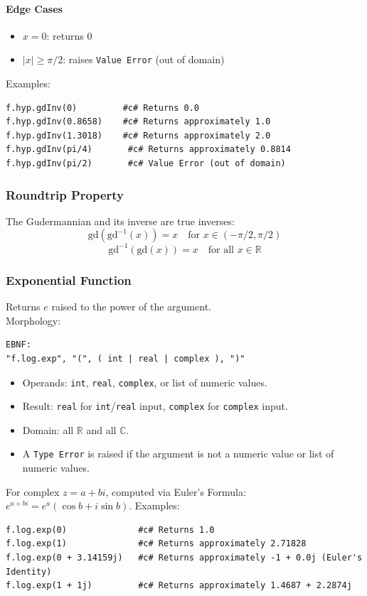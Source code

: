 \paragraph{Edge Cases}
\begin{itemize}
\item $x = 0$: returns $0$
\item $|x| \geq \pi/2$: raises \texttt{Value Error} (out of domain)
\end{itemize}

Examples:
\begin{verbatim}
f.hyp.gdInv(0)         #c# Returns 0.0
f.hyp.gdInv(0.8658)    #c# Returns approximately 1.0
f.hyp.gdInv(1.3018)    #c# Returns approximately 2.0
f.hyp.gdInv(pi/4)       #c# Returns approximately 0.8814
f.hyp.gdInv(pi/2)       #c# Value Error (out of domain)
\end{verbatim}

\subsubsection{Roundtrip Property}
The Gudermannian and its inverse are true inverses:
\[
\text{gd}(\text{gd}^{-1}(x)) = x \quad \text{for } x \in (-\pi/2, \pi/2)
\]
\[
\text{gd}^{-1}(\text{gd}(x)) = x \quad \text{for all } x \in \mathbb{R}
\]

\subsubsection{Exponential Function}
Returns $e$ raised to the power of the argument. \\
Morphology:
\begin{verbatim}
EBNF:
"f.log.exp", "(", ( int | real | complex ), ")"
\end{verbatim}
\begin{itemize}
\item Operands: \texttt{int}, \texttt{real}, \texttt{complex}, or list of numeric values.
\item Result: \texttt{real} for \texttt{int}/\texttt{real} input, \texttt{complex} for \texttt{complex} input.
\item Domain: all $\mathbb{R}$ and all $\mathbb{C}$.
\item A \texttt{Type Error} is raised if the argument is not a numeric value or list of numeric values.
\end{itemize}
For complex $z = a + bi$, computed via Euler's Formula: $e^{a+bi} = e^a(\cos b + i \sin b)$.
Examples:
\begin{verbatim}
f.log.exp(0)              #c# Returns 1.0
f.log.exp(1)              #c# Returns approximately 2.71828
f.log.exp(0 + 3.14159j)   #c# Returns approximately -1 + 0.0j (Euler's Identity)
f.log.exp(1 + 1j)         #c# Returns approximately 1.4687 + 2.2874j
\end{verbatim}

